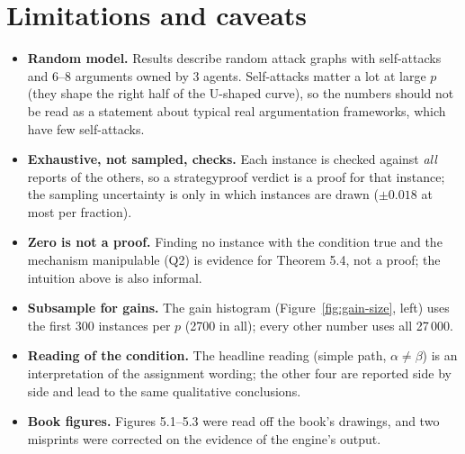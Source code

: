 \documentclass[11pt,a4paper]{article}
\begin{document}
\section{Limitations and caveats}

\begin{itemize}
\item \textbf{Random model.} Results describe random attack graphs with self-attacks and 6--8 arguments owned by 3 agents.
  Self-attacks matter a lot at large $p$ (they shape the right half of the U-shaped curve), so the numbers should not be read as
  a statement about typical real argumentation frameworks, which have few self-attacks.
\item \textbf{Exhaustive, not sampled, checks.} Each instance is checked against \emph{all} reports of the others, so a
  strategyproof verdict is a proof for that instance; the sampling uncertainty is only in which instances are drawn
  ($\pm0.018$ at most per fraction).
\item \textbf{Zero is not a proof.} Finding no instance with the condition true and the mechanism manipulable (Q2) is
  evidence for Theorem 5.4, not a proof; the intuition above is also informal.
\item \textbf{Subsample for gains.} The gain histogram (Figure~\ref{fig:gain-size}, left) uses the first 300 instances per
  $p$ (2700 in all); every other number uses all 27\,000.
\item \textbf{Reading of the condition.} The headline reading (simple path, $\alpha\ne\beta$) is an interpretation of the
  assignment wording; the other four are reported side by side and lead to the same qualitative conclusions.
\item \textbf{Book figures.} Figures 5.1--5.3 were read off the book's drawings, and two misprints were corrected on the
  evidence of the engine's output.
\end{itemize}

\end{document}

